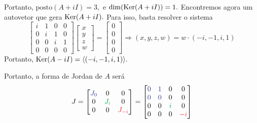 \documentclass[11pt,a4paper]{article}
\begin{document}
{\begin{itemize}
    Portanto, $\mbox{posto}(A + iI) = 3,$ e $\dim(\operatorname{Ker}(A + iI)) = 1.$ Encontremos agora um autovetor que gera $\operatorname{Ker}(A + iI).$ Para isso, basta resolver o sistema
    \[
     \begin{bmatrix}
i & 1 & 0& 0\\
0 &i &1 & 0 \\
0 &0 &i& 1 \\
0 & 0 &0& 0\end{bmatrix} \begin{bmatrix} x \\ y \\ z \\ w\end{bmatrix} = \begin{bmatrix} 0 \\ 0\\ 0 \\ 0\end{bmatrix}
     \Rightarrow (x,y,z,w) = w \cdot (-i, -1, i, 1)\]
     Portanto, $\operatorname{Ker}(A  - iI) = \langle (-i, -1, i, 1) \rangle.$
\end{itemize}

Portanto, a forma de Jordan de $A$ será
\[
J = \begin{bmatrix} \textcolor{Blue}{J_{0}} & 0 & 0 \\ 0 & \textcolor{Green}{J_{i}} & 0 \\  0 & 0  & \textcolor{Red}{J_{-i}}\end{bmatrix}
 = \begin{bmatrix}  \textcolor{Blue}{0} & \textcolor{Blue}{1} & 0 & 0\\ \textcolor{Blue}{0} & \textcolor{Blue}{0} & 0 & 0 \\ 0 & 0 & \textcolor{Green}{i} & 0 \\ 0 & 0 & 0 & \textcolor{Red}{-i} \end{bmatrix}\]
 
}
\end{document}
